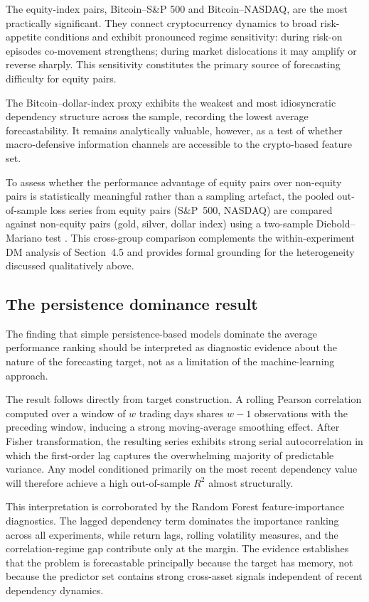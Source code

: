 The equity-index pairs, Bitcoin--S\&P 500 and Bitcoin--NASDAQ, are the most practically significant. They connect cryptocurrency dynamics to broad risk-appetite conditions and exhibit pronounced regime sensitivity: during risk-on episodes co-movement strengthens; during market dislocations it may amplify or reverse sharply. This sensitivity constitutes the primary source of forecasting difficulty for equity pairs.

The Bitcoin--dollar-index proxy exhibits the weakest and most idiosyncratic dependency structure across the sample, recording the lowest average forecastability. It remains analytically valuable, however, as a test of whether macro-defensive information channels are accessible to the crypto-based feature set.

To assess whether the performance advantage of equity pairs over non-equity pairs is statistically meaningful rather than a sampling artefact, the pooled out-of-sample loss series from equity pairs (S\&P~500, NASDAQ) are compared against non-equity pairs (gold, silver, dollar index) using a two-sample Diebold--Mariano test \citep{diebold1995}. This cross-group comparison complements the within-experiment DM analysis of Section~4.5 and provides formal grounding for the heterogeneity discussed qualitatively above.

\subsection{The persistence dominance result}

The finding that simple persistence-based models dominate the average performance ranking should be interpreted as diagnostic evidence about the nature of the forecasting target, not as a limitation of the machine-learning approach.

The result follows directly from target construction. A rolling Pearson correlation computed over a window of $w$ trading days shares $w-1$ observations with the preceding window, inducing a strong moving-average smoothing effect. After Fisher transformation, the resulting series exhibits strong serial autocorrelation in which the first-order lag captures the overwhelming majority of predictable variance. Any model conditioned primarily on the most recent dependency value will therefore achieve a high out-of-sample $R^2$ almost structurally.

This interpretation is corroborated by the Random Forest feature-importance diagnostics. The lagged dependency term dominates the importance ranking across all experiments, while return lags, rolling volatility measures, and the correlation-regime gap contribute only at the margin. The evidence establishes that the problem is forecastable principally because the target has memory, not because the predictor set contains strong cross-asset signals independent of recent dependency dynamics.

